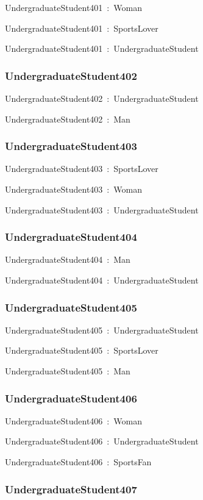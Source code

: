 \documentclass{article}
\begin{document}
UndergraduateStudent401~:~Woman

UndergraduateStudent401~:~SportsLover

UndergraduateStudent401~:~UndergraduateStudent

\subsubsection*{UndergraduateStudent402}

UndergraduateStudent402~:~UndergraduateStudent

UndergraduateStudent402~:~Man

\subsubsection*{UndergraduateStudent403}

UndergraduateStudent403~:~SportsLover

UndergraduateStudent403~:~Woman

UndergraduateStudent403~:~UndergraduateStudent

\subsubsection*{UndergraduateStudent404}

UndergraduateStudent404~:~Man

UndergraduateStudent404~:~UndergraduateStudent

\subsubsection*{UndergraduateStudent405}

UndergraduateStudent405~:~UndergraduateStudent

UndergraduateStudent405~:~SportsLover

UndergraduateStudent405~:~Man

\subsubsection*{UndergraduateStudent406}

UndergraduateStudent406~:~Woman

UndergraduateStudent406~:~UndergraduateStudent

UndergraduateStudent406~:~SportsFan

\subsubsection*{UndergraduateStudent407}
\end{document}
